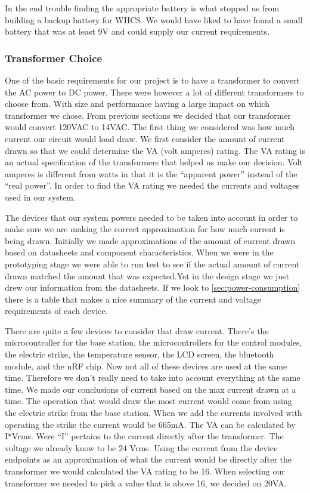 In the end trouble finding the appropriate battery is what stopped us from building a backup battery for WHCS. We would have liked to have found a small battery that was at least 9V and could supply our current requirements. 

\subsubsection{Transformer Choice}
One of the basic requirements for our project is to have a transformer to
convert the AC power to DC power. There were however a lot of different
transformers to choose from. With size and performance having a large impact on
which transformer we chose. From previous sections we decided that our
transformer would convert 120VAC to 14VAC. The first thing we considered was how
much current our circuit would load draw. We first consider the amount of current drawn
so that we could determine the VA (volt amperes) rating. The VA rating is an
actual specification of the transformers that helped us make our decision.
Volt amperes is different from watts in that it is the {}``apparent power{}''
instead of the {}``real power{}''. In order to find the VA rating we needed the
currents and voltages used in our system.

The devices that our system powers needed to be taken
into account in order to make sure we are making the correct approximation
for how much current is being drawn. Initially we made approximations of
the amount of current drawn based on datasheets and component
characteristics. When we were in the prototyping stage we were able to run test to see
if the actual amount of current drawn matched the amount that was expected.Yet in the design stage
we just drew our information from the datasheets. If we look to
\autoref{sec:power-consumption} there is a table that makes a nice summary of the
current and voltage requirements of each device.

There are quite a few devices to consider that draw current.
There{}'s the microcontroller for the base station, the microcontrollers for
the control modules, the electric strike, the temperature sensor, the LCD
screen, the bluetooth module, and the nRF chip. Now not all of these devices
are used at the same time. Therefore we don{}'t really need to take into
account everything at the same time. We made our conclusions of current
based on the max current drawn at a time. The operation that would draw the
most current would come from using the electric strike from the base station.
When we add the currents involved with operating the strike the current
would be 665mA. The VA can be calculated by I*Vrms. Were {}``I{}'' pertains
to the current directly after the transformer. The voltage we already know to
be 24 Vrms. Using the current from the device endpoints as an
approximation of what the current would be directly after the transformer we
would calculated the VA rating to be 16. When selecting our transformer we
needed to pick a value that is above 16, we decided on 20VA.

